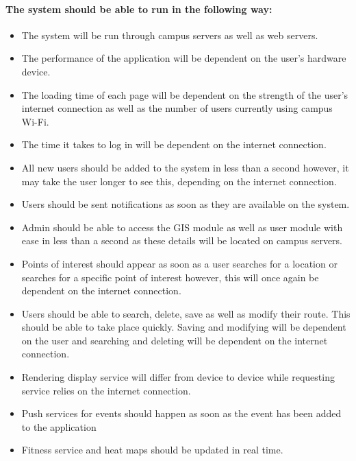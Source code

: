 \documentclass[11pt]{article}
\begin{document}
	\paragraph{The system should be able to run in the following way: }
	\begin{itemize}
	\item The system will be run through campus servers as well as web servers.
	\item The performance of the application will be dependent on the user’s hardware device.
	\item The loading time of each page will be dependent on the strength of the user’s internet connection as well as the number of users currently using campus Wi-Fi.
	\item The time it takes to log in will be dependent on the internet connection.
	\item All new users should be added to the system in less than a second however, it may take the user longer to see this, depending on the internet connection.
	\item Users should be sent notifications as soon as they are available on the system.
	\item Admin should be able to access the GIS module as well as user module with ease in less than a second as these details will be located on campus servers.
	\item Points of interest should appear as soon as a user searches for a location or searches for a specific point of interest however, this will once again be dependent on the internet connection.
	\item Users should be able to search, delete, save as well as modify their route. This should be able to take place quickly. Saving and modifying will be dependent on the user and searching and deleting will be dependent on the internet connection.
	\item Rendering display service will differ from device to device while requesting service relies on the internet connection.
	\item Push services for events should happen as soon as the event has been added to the application
	\item Fitness service and heat maps should be updated in real time.
	\end{itemize}
	
\end{document}
